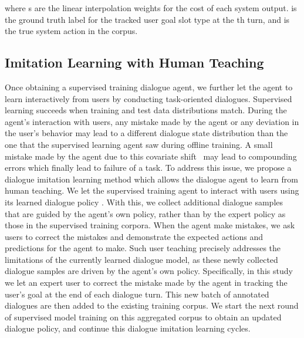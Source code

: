 \documentclass[11pt,a4paper]{article}
\begin{document}
    where s are the linear interpolation weights for the cost of each system output.  is the ground truth label for the tracked user goal slot type  at the th turn, and  is the true system action in the corpus.

\subsection{Imitation Learning with Human Teaching}
    Once obtaining a supervised training dialogue agent, we further let the agent to learn interactively from users by conducting task-oriented dialogues. Supervised learning succeeds when training and test data distributions match. During the agent's interaction with users, any mistake made by the agent or any deviation in the user's behavior may lead to a different dialogue state distribution than the one that the supervised learning agent saw during offline training. A small mistake made by the agent due to this covariate shift~\cite{ross2010efficient,ross2011reduction} may lead to compounding errors which finally lead to failure of a task. To address this issue, we propose a dialogue imitation learning method which allows the dialogue agent to learn from human teaching. We let the supervised training agent to interact with users using its learned dialogue policy . With this, we collect additional dialogue samples that are guided by the agent's own policy, rather than by the expert policy as those in the supervised training corpora. When the agent make mistakes, we ask users to correct the mistakes and demonstrate the expected actions and predictions for the agent to make. Such user teaching precisely addresses the limitations of the currently learned dialogue model, as these newly collected dialogue samples are driven by the agent's own policy. Specifically, in this study we let an expert user to correct the mistake made by the agent in tracking the user's goal at the end of each dialogue turn. This new batch of annotated dialogues are then added to the existing training corpus. We start the next round of supervised model training on this aggregated corpus to obtain an updated dialogue policy, and continue this dialogue imitation learning cycles.
\end{document}

